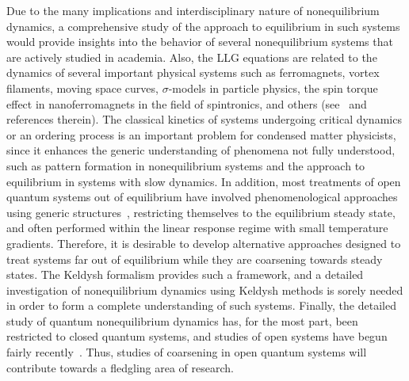 \documentclass[a4paper,11pt,color]{article}
\begin{document}
Due to the many implications and interdisciplinary nature of nonequilibrium dynamics, a comprehensive study of the approach to equilibrium in such systems would provide insights into the behavior of several nonequilibrium systems that are actively studied in academia. Also, the LLG equations are related to the dynamics of several important physical systems such as ferromagnets, vortex filaments, moving space curves, $\sigma$-models in particle physics, the spin torque effect in 
nanoferromagnets in the field of spintronics, and others (see~\cite{gll:review} and references therein). The classical kinetics of systems undergoing critical dynamics or an ordering process is an important problem for condensed matter physicists, since it enhances the generic understanding of phenomena not fully understood, such as pattern formation in nonequilibrium systems and the approach to equilibrium in systems with slow dynamics. In addition, most treatments of open quantum systems out of equilibrium have involved phenomenological approaches using generic structures~\cite{openspin}, restricting  themselves to the equilibrium steady state, and often performed within the linear response regime with small temperature gradients. Therefore, it is desirable to develop alternative approaches designed to treat systems far out of equilibrium while they are coarsening towards steady states. The Keldysh formalism provides such a framework, and a detailed investigation of nonequilibrium dynamics using Keldysh 
methods is sorely needed in order to form a complete understanding of such systems. Finally, the detailed study of quantum nonequilibrium dynamics has, for the most part, been restricted to closed quantum systems, and studies of open systems have begun fairly recently~\cite{daley}. Thus, studies of coarsening in open quantum systems will contribute towards a fledgling area of research. 
\end{document}
